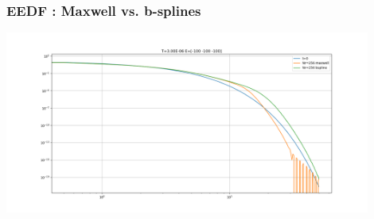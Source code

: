 \documentclass[mathserif, aspectratio=169]{beamer}
\begin{document}
\begin{frame}
	\frametitle{EEDF : Maxwell vs. b-splines}
	\begin{center}
		\includegraphics[width=0.9\textwidth]{figures/g0_3_bspline_vs_maxwell.png}
	\end{center}
\end{frame}





\end{document}
